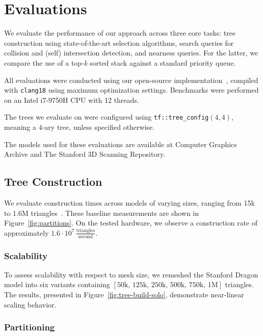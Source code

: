 \section{Evaluations}\label{sec:eval}



We evaluate the performance of our approach across three core tasks:
tree construction using state-of-the-art selection algorithms,
search queries for collision and (self) intersection detection,
and nearness queries. For the latter, we compare the use of a
top-\emph{k} sorted stack against a standard priority queue.

All evaluations were conducted using our open-source
implementation~\cite{trueform}, compiled with \texttt{clang18}
using maximum optimization settings. Benchmarks were performed
on an Intel i7-9750H CPU with 12 threads.

The trees we evaluate on were configured using
\texttt{tf::tree\_config}$(4, 4)$, meaning
a $4$-ary tree, unless specified otherwise.

The models used for these evaluations are available at
Computer Graphics Archive\cite{McGuire2017Data} and
The Stanford 3D Scanning Repository\cite{stanford3dscanrep}.


\subsection{Tree Construction} \label{sec:eval-cons}

We evaluate construction times across models of varying sizes,
ranging from 15k to 1.6M triangles~\cite{trueform}. These baseline
measurements are shown in Figure~\ref{fig:partitions}. On the
tested hardware, we observe a construction rate of approximately
$1.6 \cdot 10^7 \,\frac{\mathrm{triangles}}{\mathrm{second}}$.

\subsubsection{Scalability}

To assess scalability with respect to mesh size, we remeshed the
Stanford Dragon model into six variants containing
$[50\text{k},\, 125\text{k},\, 250\text{k},\, 500\text{k},\, 750\text{k},\, 1\text{M}]$ triangles.
The results, presented in Figure~\ref{fig:tree-build-solo},
demonstrate near-linear scaling behavior.

\subsubsection{Partitioning}\label{sec:eval-partitions}

